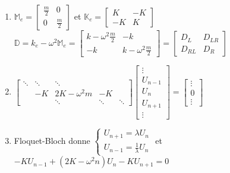 \documentclass[12pt,a4paper]{article}
\begin{document}
	\begin{sol}$ $\\
		\begin{enumerate}
			\item $\mathbb{M}_e = \left[\begin{matrix}
				\frac{m}{2} & 0 \\
				0 & \frac{m}{2}
			\end{matrix}\right]$ et $\mathbb{K}_e=\left[\begin{matrix}
				K & -K \\
				-K & K
			\end{matrix}\right]$\\
			$\mathbb{D} = k_e-\omega^2\mathbb{M}_e = \left[\begin{matrix}
				k-\omega^2\frac{m}{2} & -k \\
				-k & k-\omega^2\frac{m}{2}
			\end{matrix}\right] = \left[\begin{matrix}
				D_L & D_{LR} \\
				D_{RL} & D_R
			\end{matrix}\right]$
			
			\item $\left[\begin{matrix}
				\ddots & \ddots & \ddots \\
				& -K & 2K-\omega^2m & -K \\
				& & \ddots & \ddots & \ddots 
			\end{matrix}\right]\left[\begin{matrix}
				\vdots \\ U_{n-1} \\ U_n \\ U_{n+1} \\ \vdots
			\end{matrix}\right] = \left[\begin{matrix}
				\vdots \\
				0 \\
				\vdots
			\end{matrix}\right]$
			
			\item \begin{minipage}[t]{18.5cm}
				Floquet-Bloch donne $\begin{cases}
					U_{n+1} = \lambda U_n \\
					U_{n-1} = \frac{1}{\lambda} U_n
				\end{cases}$ et $-KU_{n-1} + (2K-\omega^2n)U_n-KU_{n+1} = 0$
			\end{minipage}
			

\end{enumerate}
\end{sol}
\end{document}
